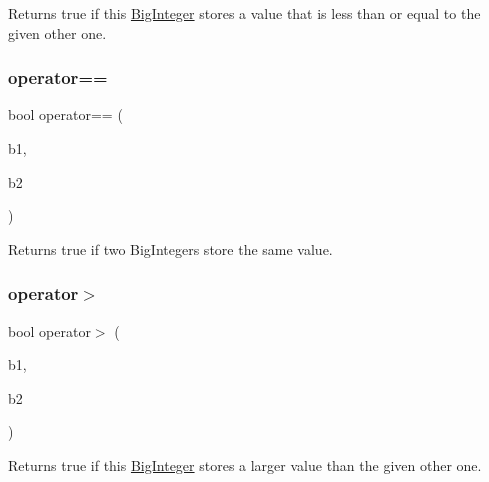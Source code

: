 Returns true if this \mbox{\hyperlink{classBigInteger}{Big\+Integer}} stores a value that is less than or equal to the given other one. 

\mbox{\label{classBigInteger_acdbc3e3ed5ef2535a628df89780d0a9b}} 
\subsubsection{\texorpdfstring{operator==}{operator==}}
{\footnotesize\ttfamily bool operator== (\begin{DoxyParamCaption}\item[{const \mbox{\hyperlink{classBigInteger}{Big\+Integer}} \&}]{b1,  }\item[{const \mbox{\hyperlink{classBigInteger}{Big\+Integer}} \&}]{b2 }\end{DoxyParamCaption})\hspace{0.3cm}{\ttfamily [friend]}}



Returns true if two Big\+Integers store the same value. 

\mbox{\label{classBigInteger_a6a9bb9ae99920398555f337f66044594}} 
\subsubsection{\texorpdfstring{operator$>$}{operator>}}
{\footnotesize\ttfamily bool operator$>$ (\begin{DoxyParamCaption}\item[{const \mbox{\hyperlink{classBigInteger}{Big\+Integer}} \&}]{b1,  }\item[{const \mbox{\hyperlink{classBigInteger}{Big\+Integer}} \&}]{b2 }\end{DoxyParamCaption})\hspace{0.3cm}{\ttfamily [friend]}}



Returns true if this \mbox{\hyperlink{classBigInteger}{Big\+Integer}} stores a larger value than the given other one. 

\mbox{\label{classBigInteger_aac387c7e85293502096e25fe753e6490}} 
